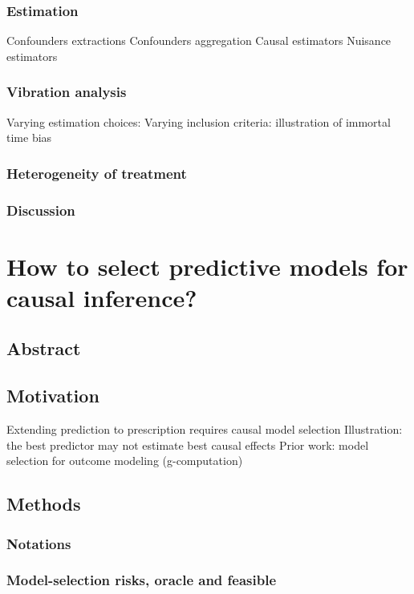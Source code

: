 \documentclass{report}
\begin{document}
\subsection{Estimation}
Confounders extractions
Confounders aggregation
Causal estimators
Nuisance estimators
\subsection{Vibration analysis}
Varying estimation choices:
Varying inclusion criteria: illustration of immortal time bias
\subsection{Heterogeneity of treatment}

\subsection{Discussion}\label{subsec:causal_tuto:discussion}

\chapter{How to select predictive models for causal inference?}\label{chapter:causal_model_selection}
\section{Abstract}\label{sec:causal_model_selection:abstract}

\section{Motivation}\label{sec:causal_model_selection:motivation}

Extending prediction to prescription requires causal model selection
Illustration: the best predictor may not estimate best causal effects
Prior work: model selection for outcome modeling (g-computation)
\section{Methods}\label{sec:causal_model_selection:methods}


\subsection{Notations}\label{subsec:causal_model_selection:notations}

\subsection{Model-selection risks, oracle and feasible}\label{subsec:causal_model_selection:risks}
\end{document}
